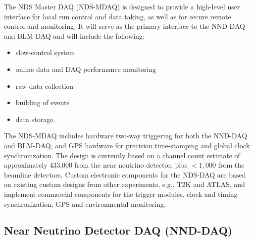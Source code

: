The NDS Master DAQ (NDS-MDAQ) %
is designed to provide a high-level user interface 
for local run control and data taking, as well as for secure remote control and monitoring.   It will 
serve as the primary interface to the NND-DAQ and BLM-DAQ and will include the following:
\begin{itemize}
\item slow-control system 
\item online data and DAQ performance monitoring  
\item raw data collection
\item building of events
\item data storage.   
\end{itemize}
The NDS-MDAQ %
includes hardware two-way triggering 
for both the NND-DAQ and BLM-DAQ, and 
GPS hardware for precision 
time-stamping and global 
clock synchronization.  %
The design is currently based on a channel count 
estimate of approximately 433,000 %
from the near neutrino
detector, plus $<1,000$ %
from the beamline detectors.  Custom electronic components for the NDS-DAQ are based on existing 
custom designs from other experiments, e.g., T2K and ATLAS, 
and %
implement commercial components for the trigger modules, clock and timing synchronization, 
GPS and environmental monitoring.



\subsection{Near Neutrino Detector DAQ (NND-DAQ)} %
\label{sec:nd:nnd:daq}

